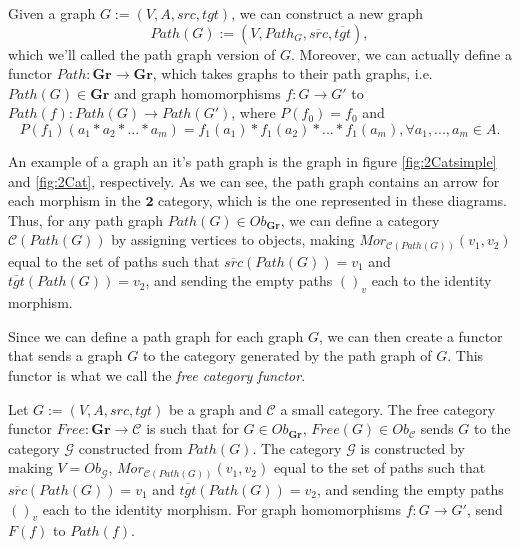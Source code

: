 \begin{definition}
  Given a graph $G:=(V, A, src, tgt)$, we can construct a new graph
  \begin{displaymath}
    Path(G) := (V, Path_G, \overline{src}, \overline{tgt}),
  \end{displaymath}
  which we'll called the path graph version of $G$.
  Moreover, we can actually define a functor $Path : \mathbf{Gr} \to \mathbf{Gr}$,
  which takes graphs to their path graphs, i.e. $Path(G) \in \mathbf {Gr}$ and
  graph homomorphisms $f:G \to G'$ to $Path(f):Path(G)\to Path(G')$, where
  $P(f_0) = f_0$ and
  \begin{displaymath}
    P(f_1)(a_1*a_2*...*a_m) = f_1(a_1)*f_1(a_2)*...*f_1(a_m), \forall a_1,...,a_m \in A.
  \end{displaymath}
\end{definition}

An example of a graph an it's path graph is the graph in figure \ref{fig:2Catsimple}
and \ref{fig:2Cat}, respectively. As we can see, the path graph contains an arrow for each
morphism in the $\mathbf{2}$ category, which is the one represented in these diagrams.
Thus, for any path graph $Path(G) \in Ob_\mathbf{Gr}$, we can define a category
$\mathcal C(Path(G))$ by assigning vertices to objects,
making $Mor_{\mathcal C(Path(G))}(v_1,v_2)$ equal to the set of paths such that
$\overline{src}(Path(G)) = v_1$ and $\overline{tgt}(Path(G)) = v_2$, and sending
the empty paths $()_v$ each to the identity morphism.

Since we can define a path graph for each graph $G$, we can then create a functor
that sends a graph $G$ to the category generated by the path graph of $G$. This
functor is what we call the \textit{free category functor}.

\begin{definition}
  Let $G:=(V, A, src, tgt)$ be a graph and $\mathcal C$ a small category. The
  free category functor $Free:\mathbf{Gr} \to \mathcal C$ is such that for
  $G \in Ob_{\mathbf{Gr}}$, $Free(G) \in Ob_{\mathcal C}$ sends $G$ to the
  category $\mathcal G$ constructed from $Path(G)$.
  The category $\mathcal G$ is constructed by making $V = Ob_\mathcal G$,
  $Mor_{\mathcal C(Path(G))}(v_1,v_2)$ equal to the set of paths such that
  $\overline{src}(Path(G)) = v_1$ and $\overline{tgt}(Path(G)) = v_2$, and sending
  the empty paths $()_v$ each to the identity morphism.
  For graph homomorphisms $f:G\to G'$, send $F(f)$ to $Path(f)$.
\end{definition}

